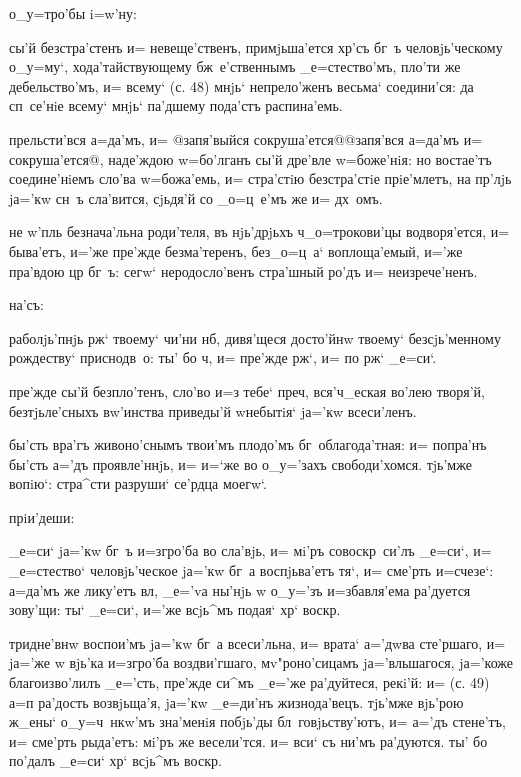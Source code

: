    о_у=тро'бы i=w'ну:

 сы'й безстра'стенъ и= невеще'ственъ, 
примjьша'ется хр'съ бг~ъ человjь'ческому о_у=му`, 
хода'тайствующему бж~е'ственнымъ _е=стество'мъ, пло'ти же 
дебельство'мъ, и= всему` (с. 48) мнjь` непрело'женъ 
весьма` соедини'ся: да сп~се'нiе всему` мнjь` па'дшему 
пода'стъ распина'емь.

 прельсти'вся а=да'мъ, и= @запя'выйся 
сокруша'ется@{@запя'вся а=да'мъ и= сокруша'ется@}, 
наде'ждою w=бо'лганъ сы'й дре'вле w=боже'нiя: но 
востае'тъ соедине'нiемъ сло'ва w=божа'емь, и= стра'стiю 
безстра'стiе прiе'млетъ, на пр'лjь jа='кw сн~ъ 
сла'вится, сjьдя'й со _о=ц~е'мъ же и= дх~омъ.

  не w'пль безнача'льна 
роди'теля, въ нjь'дрjьхъ ч _о=трокови'цы 
водворя'ется, и= быва'етъ, и='же пре'жде безма'теренъ, 
без\ъ _о=ц~а` воплоща'емый, и='же пра'вдою цр 
бг~ъ: сегw` неродосло'венъ стра'шный ро'дъ и= 
неизрече'ненъ.

   на'съ:

 раболjь'пнjь рж` твоему` чи'ни 
нб, дивя'щеся досто'йнw твоему` безсjь'менному 
рождеству` приснодв~о: ты' бо ч, и= пре'жде 
рж`, и= по рж` _е=си`.

 пре'жде сы'й безпло'тенъ, сло'во и=з\ъ 
тебе` преч, вся'ч_еская во'лею творя'й, 
безтjьле'сныхъ вw'инства приведы'й w\т небытiя` jа='кw 
всеси'ленъ.

 бы'сть вра'гъ живоно'снымъ твои'мъ 
плодо'мъ бг~облагода'тная: и= попра'нъ бы'сть а='дъ 
проявле'ннjь, и= и=`же во о_у='захъ свободи'хомся. 
тjь'мже вопiю`: стра^сти разруши` се'рдца моегw`.

     прiи'деши:

 _е=си` jа='кw бг~ъ и=з\ъ гро'ба во сла'вjь, 
и= мi'ръ совоскр~си'лъ _е=си`, и= _е=стество` 
человjь'ческое jа='кw бг~а воспjьва'етъ тя`, и= сме'рть 
и=счезе`: а=да'мъ же лику'етъ вл, _е='vа ны'нjь w\т 
о_у='зъ и=збавля'ема ра'дуется зову'щи: ты` _е=си`, и='же 
всjь^мъ подая` хр` воскр.

  тридне'внw воспои'мъ jа='кw бг~а 
всеси'льна, и= врата` а='дwва сте'ршаго, и= jа='же w\т 
вjь'ка и=з\ъ гро'ба воздви'гшаго, мv"роно'сицамъ 
jа='вльшагося, jа='коже благоизво'лилъ _е='сть, пре'жде 
си^мъ _е='же ра'дуйтеся, рекi'й: и= (с. 49)  а=п 
ра'дость возвjьща'я, jа='кw _е=ди'нъ жизнода'вецъ. 
тjь'мже вjь'рою ж_ены` о_у=ч~нкw'мъ зна'менiя побjь'ды 
бл~говjьству'ютъ, и= а='дъ стене'тъ, и= сме'рть рыда'етъ: 
мi'ръ же весели'тся. и= вси` съ ни'мъ ра'дуются. ты' бо 
по'далъ _е=си` хр` всjь^мъ воскр.


